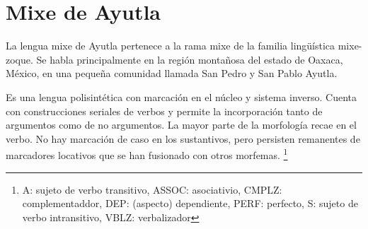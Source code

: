 \section*{Mixe de Ayutla}

\noindent La lengua mixe de Ayutla pertenece a la rama mixe de la familia lingüística mixe-zoque. Se habla principalmente en la región montañosa del estado de Oaxaca, México, en una pequeña comunidad llamada San Pedro y San Pablo Ayutla. 

Es una lengua polisintética con marcación en el núcleo y sistema inverso. Cuenta con construcciones seriales de verbos y permite la incorporación tanto de argumentos como de no argumentos. La mayor parte de la morfología recae en el verbo. No hay marcación de caso en los sustantivos, pero persisten remanentes de marcadores locativos que se han fusionado con otros morfemas. 
\footnote{A: sujeto de verbo transitivo, ASSOC: asociativio, CMPLZ: complementaddor, DEP: (aspecto) dependiente, PERF: perfecto, S: sujeto de verbo intransitivo, VBLZ: verbalizador}
\vspace{0.5cm}
